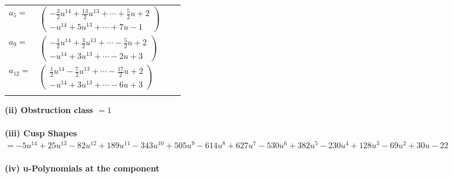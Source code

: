 \documentclass[1p]{elsarticle_modified}
\theoremstyle{definition}
\begin{document}
\begin{tabular}{m{7pt} m{180pt} m{7pt} m{180pt} }
\flushright $a_{5}=$&$\begin{pmatrix}-\frac{3}{2} u^{14}+\frac{13}{2} u^{13}+\cdots+\frac{5}{2} u+2\\- u^{14}+5 u^{13}+\cdots+7 u-1\end{pmatrix}$ \\
\flushright $a_{9}=$&$\begin{pmatrix}-\frac{1}{2} u^{14}+\frac{3}{2} u^{13}+\cdots-\frac{5}{2} u+2\\- u^{14}+3 u^{13}+\cdots-2 u+3\end{pmatrix}$ \\
\flushright $a_{12}=$&$\begin{pmatrix}\frac{1}{2} u^{14}-\frac{7}{2} u^{13}+\cdots-\frac{17}{2} u+2\\- u^{14}+3 u^{13}+\cdots-6 u+3\end{pmatrix}$\\&\end{tabular}
\flushleft \textbf{(ii) Obstruction class $= 1$}\\~\\
\flushleft \textbf{(iii) Cusp Shapes $= -5 u^{14}+25 u^{13}-82 u^{12}+189 u^{11}-343 u^{10}+505 u^9-614 u^8+627 u^7-530 u^6+382 u^5-230 u^4+128 u^3-69 u^2+30 u-22$}\\~\\
\newpage\renewcommand{\arraystretch}{1}
\flushleft \textbf{(iv) u-Polynomials at the component}\newline \\
\end{document}
